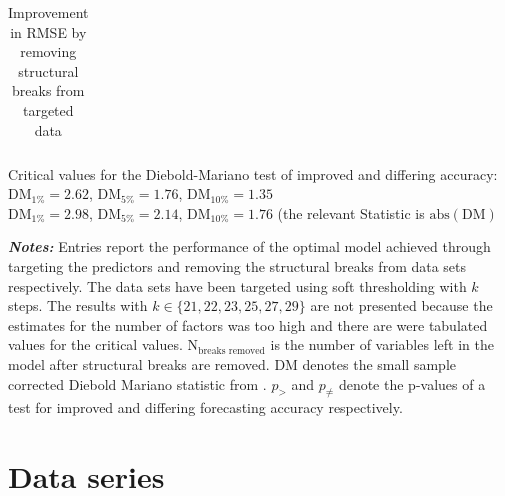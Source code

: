 \documentclass[12pt]{article}
\begin{document}
\begin{table}[htp]
\begin{tabular}{cc|lll|lll}
		\hline
	\end{tabular}

	\begin{minipage}{14cm}
		Critical values for the Diebold-Mariano test of improved and differing accuracy: \\ DM$_{1\%} = 2.62$, DM$_{5\%} = 1.76$, DM$_{10\%} = 1.35$ \\ DM$_{1\%} = 2.98$, DM$_{5\%} = 2.14$, DM$_{10\%} = 1.76$ (the relevant Statistic is $\text{abs}(\text{DM})$
	\end{minipage}
	\begin{minipage}{16cm}
		\small{\textbf{\textit{Notes:}} Entries report the performance of the optimal model achieved through targeting the predictors and removing the structural breaks from data sets respectively. The data sets have been targeted using soft thresholding with $k$ steps. The results with $k \in \{21, 22, 23, 25, 27, 29\}$ are not presented because the estimates for the number of factors was too high and there are were tabulated values for the critical values. N$_{\text{breaks removed}}$ is the number of variables left in the model after structural breaks are removed. DM denotes the small sample corrected Diebold Mariano statistic from \citet{harvey1997testing}. $p_>$ and $p_{\not =}$ denote the p-values of a test for improved and differing forecasting accuracy respectively.}
	\end{minipage}
	\caption{Improvement in RMSE by removing structural breaks from targeted data}
	\label{diff rmse by removing breaks after targeting}
\end{table}





\clearpage
\newpage

\section{Data series}
\label{Data series}
\end{document}

